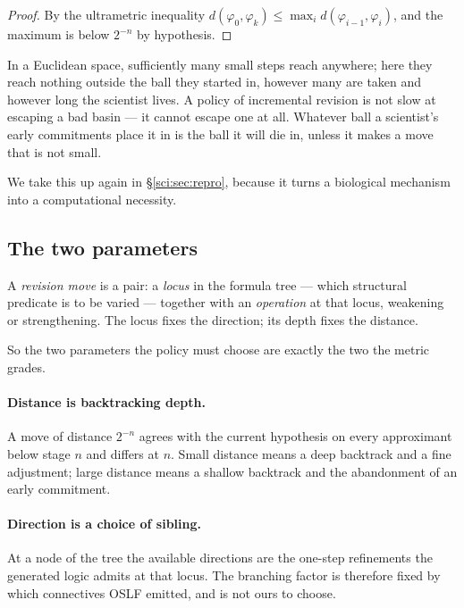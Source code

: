 \begin{proof}
By the ultrametric inequality $d(\varphi_0, \varphi_k) \le \max_i d(\varphi_{i-1}, \varphi_i)$, and
the maximum is below $2^{-n}$ by hypothesis.
\end{proof}

In a Euclidean space, sufficiently many small steps reach anywhere; here they reach nothing outside the
ball they started in, however many are taken and however long the scientist lives. A policy of
incremental revision is not slow at escaping a bad basin --- it cannot escape one at all. Whatever ball
a scientist's early commitments place it in is the ball it will die in, unless it makes a move that is
not small.

We take this up again in \S\ref{sci:sec:repro}, because it turns a biological mechanism into a
computational necessity.

\subsection{The two parameters}\label{sci:S6.2}

\begin{definition}
\label{sci:def:move}
A \emph{revision move} is a pair: a \emph{locus} in the formula tree --- which structural predicate is
to be varied --- together with an \emph{operation} at that locus, weakening or strengthening. The
locus fixes the direction; its depth fixes the distance.
\end{definition}

So the two parameters the policy must choose are exactly the two the metric grades.

\paragraph{Distance is backtracking depth.} A move of distance $2^{-n}$ agrees with the current
hypothesis on every approximant below stage $n$ and differs at $n$. Small distance means a deep
backtrack and a fine adjustment; large distance means a shallow backtrack and the abandonment of an
early commitment.

\paragraph{Direction is a choice of sibling.} At a node of the tree the available directions are the
one-step refinements the generated logic admits at that locus. The branching factor is therefore fixed
by which connectives OSLF emitted, and is not ours to choose.

